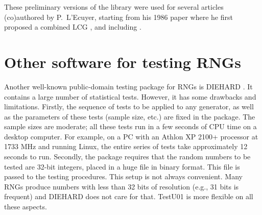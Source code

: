 These preliminary versions of the library were used for several 
articles (co)authored by P.\ L'Ecuyer, starting from his 1986 paper
where he first proposed a combined LCG \cite{rLEC86a}, and including
\cite{rLEC88a,rLEC92a,rLEC97d,rLEC97h,rLEC98h,rLEC02c,rLEC98t,rLEC99e,%
rLEC00c,rLEC01a,rLEC03c,rLEC01d}.

\iffalse  %
The way this library was born and grew up certainly had an important
influence on its design.  
Things were added layer after layer along the years.
Global variables abound, because this is the way things were made
in the (relatively small) original Pascal and Modula-2 versions,
partly in the interest of speed and reduced memory utilization.
Some have been removed in the C version, but others remain.
It we could afford the luxury of redoing the library entirely from
scratch tomorrow, the design would certainly be somewhat different,
probably more objected-oriented (e.g., the functions that set the 
current generator, in modules {\tt u\ldots}, could return a generator
object that would be passed as a parameter to testing functions,
instead of using a global variable for the current generator.
The tests could also return a pointer to a structure (i.e., an object)
that contains their detailed results, instead of just writing them
to the current output).
This may happen in future versions.
\fi  %

\section {Other software for testing RNGs}

Another well-known public-domain testing package for RNGs is 
DIEHARD \cite{rMAR96b}.
%
It contains a large number of statistical tests.
However, it has some drawbacks and limitations.
Firstly, the sequence of tests to be applied to any generator,
as well as the parameters of these tests (sample size, etc.) are
fixed in the package.  The sample sizes are moderate;
all these tests run in a few seconds of CPU time on a desktop computer.
For example, on a PC with an Athlon XP 2100+ processor at 1733 MHz
and running Linux, the entire series of tests take approximately 
12 seconds to run.
Secondly, the package requires that the random numbers to be tested
are 32-bit integers, placed in a huge file in binary format.
This file is passed to the testing procedures.
This setup is not always convenient. 
Many RNGs produce numbers with less than 32 bits of resolution 
(e.g., 31 bits is frequent) and DIEHARD does not care for that.
{TestU01} is more flexible on all these aspects.

